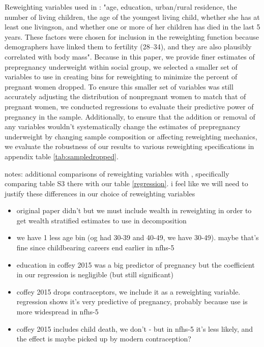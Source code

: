 Reweighting variables used in \cite{coffey2015prepregnancy}: "age, education, urban/rural residence, the number of living children, the age of the youngest living child, whether she has at least one livingson, and whether one or more of her children has died in the last 5 years. These factors were chosen for inclusion in the reweighting function because demographers have linked them to fertility (28–34), and they are also plausibly correlated with body mass". Because in this paper, we provide finer estimates of prepregnancy underweight within social group, we selected a smaller set of variables to use in creating bins for reweighting to minimize the percent of pregnant women dropped. To ensure this smaller set of variables was still accurately adjusting the distribution of nonpregnant women to match that of pregnant women, we conducted regressions to evaluate their predictive power of pregnancy in the sample. Additionally, to ensure that the addition or removal of any variables wouldn't systematically change the estimates of prepregnancy underweight by changing sample composition or affecting reweighting mechanics, we evaluate the robustness of our results to various reweighting specifications in appendix table \ref{tab:sampledropped}.

notes: additional comparisons of reweighting variables with \cite{coffey2015prepregnancy}, specifically comparing table S3 there with our table \ref{regression}. i feel like we will need to justify these differences in our choice of reweighting variables
\begin{itemize}
    \item original paper didn't but we must include wealth in reweighting in order to get wealth stratified estimates to use in decomposition
    \item we have 1 less age bin (og had 30-39 and 40-49, we have 30-49). maybe that's fine since childbearing careers end earlier in nfhs-5
    \item  education in coffey 2015 was a big predictor of pregnancy but the coefficient in our regression is negligible (but still significant)
    \item coffey 2015 drops contraceptors, we include it as a reweighting variable. regression shows it's very predictive of pregnancy, probably because use is more widespread in nfhs-5
    \item coffey 2015 includes child death, we don't - but in nfhs-5 it's less likely, and the effect is maybe picked up by modern contraception? 
\end{itemize}




